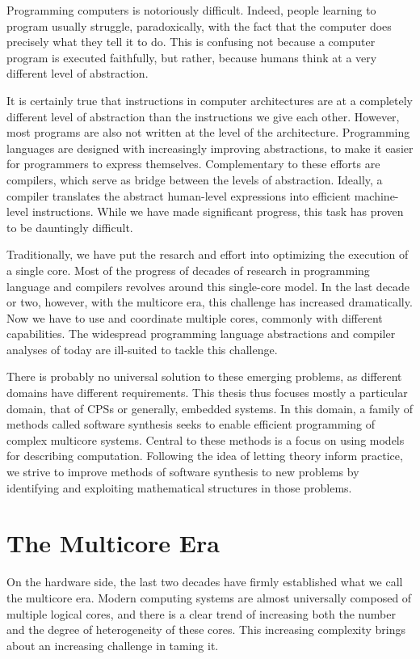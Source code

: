 Programming computers is notoriously difficult.
Indeed, people learning to program usually struggle, paradoxically, with the fact that the computer does precisely what they tell it to do. 
This is confusing not because a computer program is executed faithfully, but rather, because humans think at a very different level of abstraction.

It is certainly true that instructions in computer architectures are at a completely different level of abstraction than the instructions we give each other.
However, most programs are also not written at the level of the architecture.
Programming languages are designed with increasingly improving abstractions, to make it easier for programmers to express themselves.
Complementary to these efforts are compilers, which serve as bridge between the levels of abstraction.
Ideally, a compiler translates the abstract human-level expressions into efficient machine-level instructions.
While we have made significant progress, this task has proven to be dauntingly difficult.

Traditionally, we have put the resarch and effort into optimizing the execution of a single core.
Most of the progress of decades of research in programming language and compilers revolves around this single-core model.
In the last decade or two, however, with the multicore era, this challenge has increased dramatically.
Now we have to use and coordinate multiple cores, commonly with different capabilities.
The widespread programming language abstractions and compiler analyses of today are ill-suited to tackle this challenge.

There is probably no universal solution to these emerging problems, as different domains have different requirements.
This thesis thus focuses mostly a particular domain, that of \acfp{CPS} or generally, embedded systems.
In this domain, a family of methods called software synthesis seeks to enable efficient programming of complex multicore systems.
Central to these methods is a focus on using models for describing computation.
Following the idea of letting theory inform practice, we strive to improve methods of software synthesis to new problems by identifying and exploiting mathematical structures in those problems.

\section{The Multicore Era}

On the hardware side, the last two decades have firmly established what we call the multicore era.
Modern computing systems are almost universally composed of multiple logical cores, and there is a clear trend of increasing both the number and the degree of heterogeneity of these cores.
This increasing complexity brings about an increasing challenge in taming it.

